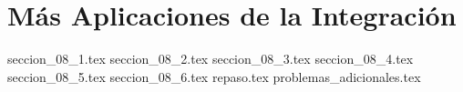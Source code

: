 
\chapter{Más Aplicaciones de la Integración}

{seccion_08_1.tex}
{seccion_08_2.tex}
{seccion_08_3.tex}
{seccion_08_4.tex}
{seccion_08_5.tex}
{seccion_08_6.tex}
{repaso.tex}
{problemas_adicionales.tex}

